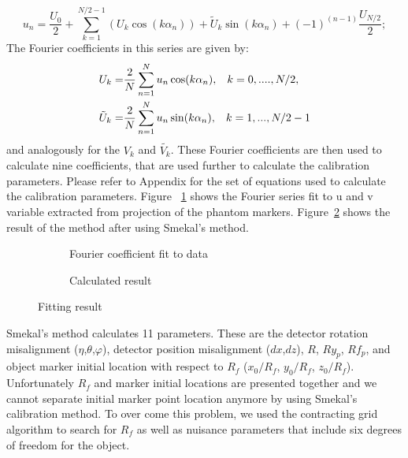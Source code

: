 \begin{equation}\label{eq:fourierseries}
u_n = \frac{U_0}{2} + \sum ^{N/2-1}_{k=1} (U_k \cos (k\alpha_n)) + \tilde{U}_k \sin (k \alpha_n) + (-1)^{(n-1)} \frac{U_{N/2}}{2};
\end{equation}
The Fourier coefficients in this series are given by:
\begin{equation}\label{eq:fouriercoeff}
\begin{split}
U_k = & \frac{2}{N}\sum_{n=1}^{N} u_n \cos (k \alpha_n), \hspace{0.3cm} k = 0, ...., N/2, \\
\tilde{U}_k = & \frac{2}{N} \sum_{n=1}^{N} u_n \sin (k \alpha_n), \hspace{0.3cm} k = 1,...,N/2-1
\end{split}
\end{equation}
and analogously for the $V_k$ and $\tilde{V_k}$.
These Fourier coefficients are then used to calculate nine coefficients, that are used further to calculate the calibration parameters.  Please refer to Appendix for the set of equations used to calculate the calibration parameters.  Figure ~\ref{fig:FourierFit} shows the Fourier series fit to u and v variable extracted from projection of the phantom markers.  Figure~\ref{fig:smekalresult} shows the result of the method after using Smekal's method.

\begin{figure}
\centering
	\begin{subfigure}[b]{0.4\linewidth}
	\centering
	\label{fig:FourierFit}
	\caption{Fourier coefficient fit to data}
	\end{subfigure}
\hspace{0.2cm}
	\begin{subfigure}[b]{0.4\linewidth}
	\centering
	\label{fig:smekalresult}
	\caption{Calculated result}
	\end{subfigure}
\label{fig:smekal_method}	
\caption{Fitting result}
\end{figure}
Smekal's method calculates 11 parameters.  These are the detector rotation misalignment ($\eta$,$\theta$,$\varphi$), detector position misalignment ($dx$,$dz$), $R$, $Ry_p$, $Rf_p$, and object marker initial location with respect to $R_f$ ($x_0/R_f$, $y_0/R_f$, $z_0/R_f$).  Unfortunately $R_f$ and marker initial locations are presented together and we cannot separate initial marker point location anymore by using Smekal's calibration method.  To over come this problem, we used the contracting grid algorithm to search for $R_f$ as well as nuisance parameters that include six degrees of freedom for the object.
